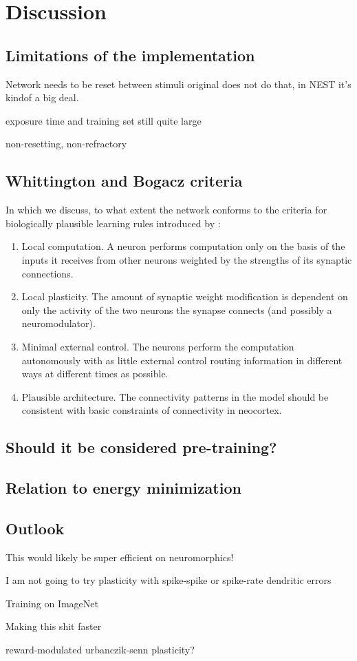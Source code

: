 
\chapter{Discussion}


\section{Limitations of the implementation}

Network needs to be reset between stimuli
original does not do that, in NEST it's kindof a big deal.

exposure time and training set still quite large

non-resetting, non-refractory


\section{Whittington and Bogacz criteria}

In which we discuss, to what extent the network conforms to the criteria for biologically plausible learning rules
introduced by \cite{Whittington2017}:
\begin{enumerate}
    \item Local computation. A neuron performs computation only on the basis
          of the inputs it receives from other neurons weighted by the strengths
          of its synaptic connections.
    \item  Local plasticity. The amount of synaptic weight modification is dependent on only the activity of the two
          neurons the synapse connects (and possibly a neuromodulator).
    \item  Minimal external control. The neurons perform the computation autonomously with as little external control
          routing information in different ways at different times as possible.
    \item   Plausible architecture. The connectivity patterns in the model should
          be consistent with basic constraints of connectivity in neocortex.
\end{enumerate}

\section{Should it be considered pre-training?}



\section{Relation to energy minimization}

\section{Outlook}

This would likely be super efficient on neuromorphics!

I am not going to try plasticity with spike-spike or spike-rate dendritic errors

Training on ImageNet

Making this shit faster

reward-modulated urbanczik-senn plasticity?

